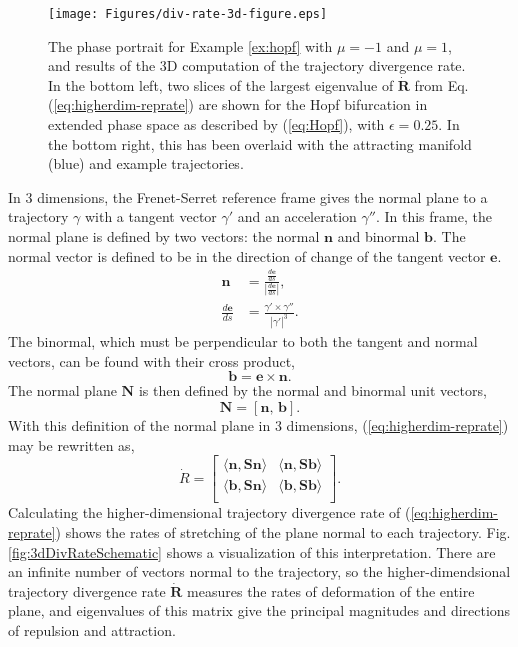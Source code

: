 \documentclass[twocolumn]{svjour3}
\begin{document}
\begin{figure}
	\centering
	\texttt{[image: Figures/div-rate-3d-figure.eps]}
	\caption{The phase portrait for Example \ref{ex:hopf} with $\mu=-1$ and $\mu=1$, and results of the 3D computation of the trajectory divergence rate. In the bottom left, two slices of the largest eigenvalue of $\dot{\mathbf{R}}$ from Eq. (\ref{eq:higherdim-reprate}) are shown for the Hopf bifurcation in extended phase space as described by (\ref{eq:Hopf}), with $\epsilon=0.25$. In the bottom right, this has been overlaid with the attracting manifold (blue) and example trajectories.}
	\label{fig:Hopf}
\end{figure}

In 3 dimensions, the Frenet-Serret reference frame gives the normal plane to a trajectory $\gamma$ with a tangent vector $\gamma'$ and an acceleration $\gamma''$. In this frame, the normal plane is defined by two vectors: the normal $\mathbf{n}$ and binormal $\mathbf{b}$. The normal vector is defined to be in the direction of change of the tangent vector $\mathbf{e}$.
\begin{equation}
\begin{aligned}
{\mathbf{n}} &= \frac{\tfrac{d{\mathbf{e}}}{ds}}{\left|\tfrac{d{\mathbf{e}}}{ds}\right|}, \\
\frac{d{\mathbf{e}}}{ds} &= \frac{\gamma'\times\gamma''}{\left|\gamma'\right|^3}.
\end{aligned}
\end{equation}
The binormal, which must be perpendicular to both the tangent and normal vectors, can be found with their cross product,
\begin{equation}
{\mathbf{b}} = {\mathbf{e}}\times{\mathbf{n}}.
\end{equation}
The normal plane $\mathbf{N}$ is then defined by the normal and binormal unit vectors,
\begin{equation}
\mathbf{N} = \left[{\mathbf{n}},\,{\mathbf{b}}\right].
\end{equation}
With this definition of the normal plane in 3 dimensions, (\ref{eq:higherdim-reprate}) may be rewritten as,
\begin{equation}
\dot{R} = \left[\begin{array}{cc}
\langle{\mathbf{n}}, \mathbf{S}{\mathbf{n}}\rangle & \langle{\mathbf{n}}, \mathbf{S}{\mathbf{b}}\rangle \\
\langle{\mathbf{b}}, \mathbf{S}{\mathbf{n}}\rangle & \langle{\mathbf{b}}, \mathbf{S}{\mathbf{b}}\rangle  \\
\end{array}\right].
\end{equation}
Calculating the higher-dimensional trajectory divergence rate of (\ref{eq:higherdim-reprate}) shows the rates of stretching of the plane normal to each trajectory. Fig. \ref{fig:3dDivRateSchematic} shows a visualization of this interpretation. There are an infinite number of vectors normal to the trajectory, so the higher-dimendsional trajectory divergence rate $\dot{\mathbf{R}}$ measures the rates of deformation of the entire plane, and eigenvalues of this matrix give the principal magnitudes and directions of repulsion and attraction.
\end{document}

